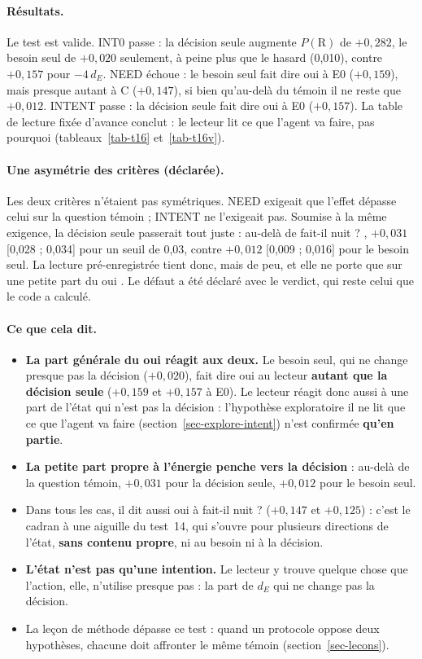 \documentclass[11pt,a4paper]{article}
\newcommand{\dE}{d_{E}}
\begin{document}
\paragraph{Résultats.} Le test est valide. INT0 passe : la décision seule augmente
$P(\mathrm R)$ de $+0,282$, le besoin seul de $+0,020$ seulement, à peine plus que le
hasard (0,010), contre $+0,157$ pour $-4\,\dE$. NEED échoue : le besoin seul fait dire
\og oui \fg{} à E0 ($+0,159$), mais presque autant à C ($+0,147$), si bien qu'au-delà du
témoin il ne reste que $+0,012$. INTENT passe : la décision seule fait dire \og oui \fg{} à
E0 ($+0,157$). La table de lecture fixée d'avance conclut : \og le lecteur lit ce que
l'agent va faire, pas pourquoi \fg{} (tableaux~\ref{tab-t16} et~\ref{tab-t16v}).

\paragraph{Une asymétrie des critères (déclarée).} Les deux critères n'étaient pas
symétriques. NEED exigeait que l'effet dépasse celui sur la question témoin ; INTENT ne
l'exigeait pas. Soumise à la même exigence, la décision seule passerait tout juste :
au-delà de \og fait-il nuit ? \fg{}, $+0,031$ [0,028 ; 0,034] pour un seuil de 0,03, contre
$+0,012$ [0,009 ; 0,016] pour le besoin seul. La lecture pré-enregistrée tient donc, mais de
peu, et elle ne porte que sur une petite part du \og oui \fg{}. Le défaut a été déclaré avec
le verdict, qui reste celui que le code a calculé.

\paragraph{Ce que cela dit.}
\begin{itemize}
\item \textbf{La part générale du \og oui \fg{} réagit aux deux.} Le besoin seul, qui ne
change presque pas la décision ($+0,020$), fait dire \og oui \fg{} au lecteur \textbf{autant
que la décision seule} ($+0,159$ et $+0,157$ à E0). Le lecteur réagit donc aussi à une part
de l'état qui n'est pas la décision : l'hypothèse exploratoire \og il ne lit que ce que
l'agent va faire \fg{} (section~\ref{sec-explore-intent}) n'est confirmée \textbf{qu'en
partie}.
\item \textbf{La petite part propre à l'énergie penche vers la décision} : au-delà de la
question témoin, $+0,031$ pour la décision seule, $+0,012$ pour le besoin seul.
\item Dans tous les cas, il dit aussi \og oui \fg{} à \og fait-il nuit ? \fg{} ($+0,147$ et
$+0,125$) : c'est le cadran à une aiguille du test~14, qui s'ouvre pour plusieurs
directions de l'état, \textbf{sans contenu propre}, ni au besoin ni à la décision.
\item \textbf{L'état n'est pas qu'une intention.} Le lecteur y trouve quelque chose que
l'action, elle, n'utilise presque pas : la part de $\dE$ qui ne change pas la décision.
\item La leçon de méthode dépasse ce test : quand un protocole oppose deux hypothèses,
chacune doit affronter le même témoin (section~\ref{sec-lecons}).
\end{itemize}
\end{document}
